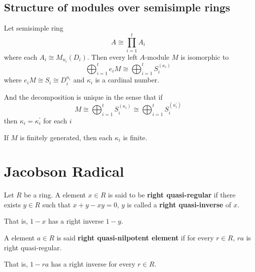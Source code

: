 \subsection{Structure of modules over semisimple rings} %




\begin{theorem}
    Let semisimple ring
    \begin{equation*}
        A\cong \prod_{i=1}^t A_i
    \end{equation*}
    where each $A_i\cong M_{n_i}(D_i)$.
    Then every left $A$-module $M$ is isomorphic to
    \begin{equation*}
        \bigoplus_{i=1}^t e_iM
        \cong
        \bigoplus_{i=1}^t S_i^{\left(\kappa_i\right)}
    \end{equation*}
    where $e_iM\cong S_i\cong D_i^{n_i}$  and $\kappa_i$ is a cardinal number.

    And the decomposition is unique in the sense that if
    \begin{equation*}
        M \cong \bigoplus_{i=1}^t S_i^{\left(\kappa_i\right)} \cong \bigoplus_{i=1}^t S_i^{\left(\kappa_i^{\prime}\right)}
    \end{equation*}
    then $\kappa_i=\kappa_i^{\prime}$ for each $i$
    \begin{remark}
        If $M$ is finitely generated, then each $\kappa_i$ is finite.
    \end{remark}
\end{theorem}


\section{Jacobson Radical} %

\begin{definition}
    Let $R$ be a ring. A element $x \in R$ is said to be \textbf{right quasi-regular} if there exists $y \in R$ such that $x+y-xy=0$, $y$ is called a \textbf{right quasi-inverse} of $x$.
    \begin{remark}
        That is, $1-x$ has a right inverse $1-y$.
    \end{remark}

\end{definition}
\begin{definition}
    A element $a\in R$ is said \textbf{right quasi-nilpotent element} if for every $r \in R$, $r a$ is right quasi-regular.
    \begin{remark}
        That is, $1-ra$ has a right inverse for every $r \in R$.
    \end{remark}
\end{definition}

